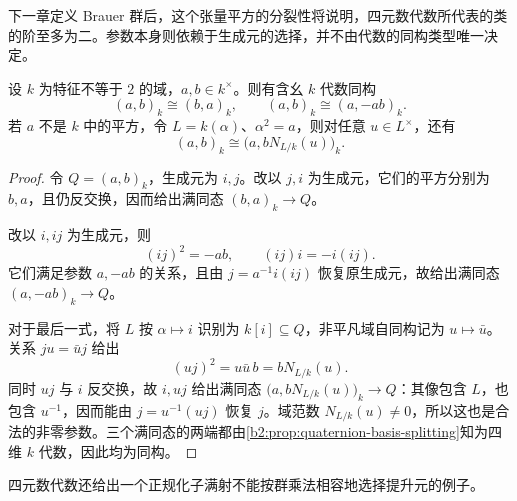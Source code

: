 下一章定义 Brauer 群后，这个张量平方的分裂性将说明，四元数代数所代表的类的阶至多为二。参数本身则依赖于生成元的选择，并不由代数的同构类型唯一决定。

\begin{proposition}\label{b2:prop:quaternion-parameter-changes}
	设 \(k\) 为特征不等于 \(2\) 的域，\(a,b\in k^\times\)。则有含幺 \(k\) 代数同构
	\[
		(a,b)_k\cong(b,a)_k,\qquad (a,b)_k\cong(a,-ab)_k.
	\]
	若 \(a\) 不是 \(k\) 中的平方，令 \(L=k(\alpha)\)、\(\alpha^2=a\)，则对任意 \(u\in L^\times\)，还有
	\[
		(a,b)_k\cong\bigl(a,bN_{L/k}(u)\bigr)_k.
	\]
\end{proposition}
\begin{proof}
	令 \(Q=(a,b)_k\)，生成元为 \(i,j\)。改以 \(j,i\) 为生成元，它们的平方分别为 \(b,a\)，且仍反交换，因而给出满同态 \((b,a)_k\to Q\)。

	改以 \(i,ij\) 为生成元，则
	\[
		(ij)^2=-ab,\qquad (ij)i=-i(ij).
	\]
	它们满足参数 \(a,-ab\) 的关系，且由 \(j=a^{-1}i(ij)\) 恢复原生成元，故给出满同态 \((a,-ab)_k\to Q\)。

	对于最后一式，将 \(L\) 按 \(\alpha\mapsto i\) 识别为 \(k[i]\subseteq Q\)，非平凡域自同构记为 \(u\mapsto\bar u\)。关系 \(ju=\bar u j\) 给出
	\[
		(uj)^2=u\bar u\,b=bN_{L/k}(u).
	\]
	同时 \(uj\) 与 \(i\) 反交换，故 \(i,uj\) 给出满同态 \(\bigl(a,bN_{L/k}(u)\bigr)_k\to Q\)：其像包含 \(L\)，也包含 \(u^{-1}\)，因而能由 \(j=u^{-1}(uj)\) 恢复 \(j\)。域范数 \(N_{L/k}(u)\ne0\)，所以这也是合法的非零参数。三个满同态的两端都由\cref{b2:prop:quaternion-basis-splitting}知为四维 \(k\) 代数，因此均为同构。
\end{proof}

四元数代数还给出一个正规化子满射不能按群乘法相容地选择提升元的例子。

